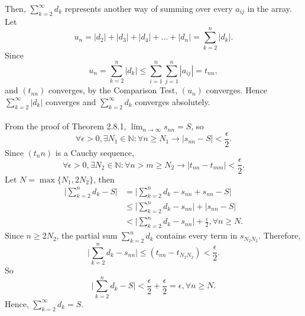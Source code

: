\documentclass{article}
\begin{document}
            Then, $\sum_{k=2}^\infty d_k$ represents another way of summing over every $a_{ij}$ in the array. Let
            \begin{equation*}
                u_n = |d_2| + |d_3| + |d_4| + \dots + |d_n| = \sum_{k=2}^n |d_k|.
            \end{equation*}
            Since
            \begin{equation*}
                u_n = \sum_{k=2}^n |d_k| \leq \sum_{i=1}^n \sum_{j=1}^n |a_{ij}| = t_{nn},
            \end{equation*}
            and $(t_{nn})$ converges, by the Comparison Test, $(u_n)$ converges. Hence $\sum_{k=2}^\infty |d_k|$ converges and $\sum_{k=2}^\infty d_k$ converges absolutely.\\ \\
            From the proof of Theorem 2.8.1, $\lim_{n \to \infty} s_{nn} = S$, so
            \begin{equation*}
                \forall \epsilon > 0, \exists N_1 \in \mathbb{N} : \forall n \geq N_1 \longrightarrow |s_{nn}-S| < \frac{\epsilon}{2}.
            \end{equation*}
            Since $(t_nn)$ is a Cauchy sequence,
            \begin{equation*}
                \forall \epsilon > 0, \exists N_2 \in \mathbb{N} : \forall n > m \geq N_2 \longrightarrow |t_{nn}-t_{mm}| < \frac{\epsilon}{2}.
            \end{equation*}
            Let $N = \max \{N_1,2N_2\}$, then
            \begin{align*}
                \Bigg| \sum_{k=2}^n d_k -S \Bigg| & = \Bigg| \sum_{k=2}^n d_k - s_{nn} + s_{nn} - S \Bigg| \\
                & \leq \Bigg| \sum_{k=2}^n d_k - s_{nn} \Bigg| + |s_{nn} - S| \\ 
                & < \Bigg| \sum_{k=2}^n d_k - s_{nn} \Bigg| + \frac{\epsilon}{2}, \forall n \geq N.
            \end{align*}
            Since $n \geq 2N_2$, the partial sum $\sum_{k=2}^n d_k$ contains every term in $s_{N_2N_2}$. Therefore,
            \begin{equation*}
                \Bigg| \sum_{k=2}^n d_k - s_{nn} \Bigg| \leq (t_{nn} - t_{N_2N_2}) < \frac{\epsilon}{2}.
            \end{equation*}
            So
            \begin{equation*}
                \Bigg| \sum_{k=2}^n d_k -S \Bigg| < \frac{\epsilon}{2} + \frac{\epsilon}{2} = \epsilon, \forall n \geq N.
            \end{equation*}
            Hence, $\sum_{k=2}^\infty d_k = S$.
            
\end{document}
